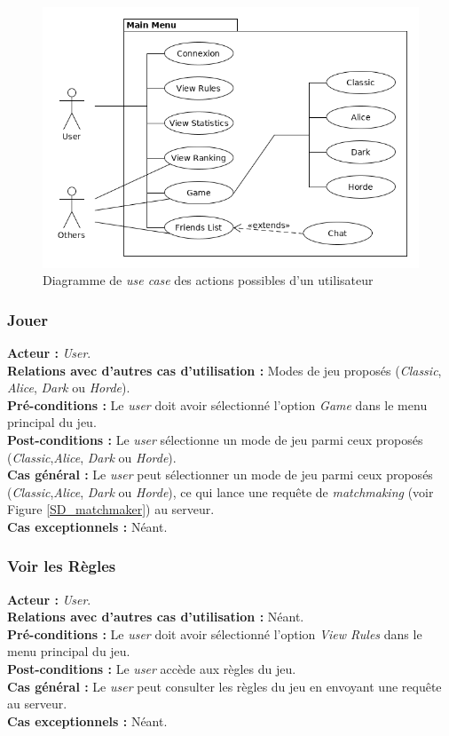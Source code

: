 \documentclass[10pt, a4paper]{article}
\begin{document}
\begin{figure}[ht]
\begin{center}
\includegraphics[scale=0.5]{UC_mainmenu.png}
\caption{Diagramme de \textit{use case} des actions possibles d'un utilisateur}
\label{UC_menu} %
\end{center}
\end{figure}

\subsubsection{Jouer}
\textbf{Acteur :} \textit{User}.\\
\textbf{Relations avec d'autres cas d'utilisation :} Modes de jeu proposés (\textit{Classic}, \textit{Alice}, \textit{Dark} ou \textit{Horde}).\\
\textbf{Pré-conditions :} Le \textit{user} doit avoir sélectionné l'option \textit{Game} dans le menu principal du jeu.\\
\textbf{Post-conditions :} Le  \textit{user} sélectionne un mode de jeu parmi ceux proposés (\textit{Classic},\textit{Alice}, \textit{Dark} ou \textit{Horde}).\\
\textbf{Cas général :} Le  \textit{user} peut sélectionner un mode de jeu parmi ceux proposés (\textit{Classic},\textit{Alice}, \textit{Dark} ou \textit{Horde}), ce qui lance une requête de \textit{matchmaking} (voir Figure \ref{SD_matchmaker}) au serveur.\\
\textbf{Cas exceptionnels :} Néant.



\subsubsection{Voir les Règles}
\textbf{Acteur :} \textit{User}.\\
\textbf{Relations avec d'autres cas d'utilisation :} Néant.\\
\textbf{Pré-conditions :} Le \textit{user} doit avoir sélectionné l'option \textit{View Rules} dans le menu principal du jeu.\\
\textbf{Post-conditions :} Le \textit{user} accède aux règles du jeu.\\
\textbf{Cas général :} Le \textit{user} peut consulter les règles du jeu en envoyant une requête au serveur.\\
\textbf{Cas exceptionnels :} Néant.
\end{document}
